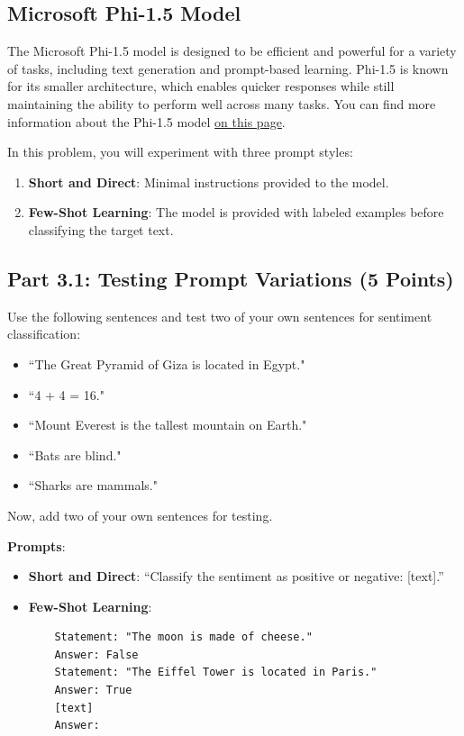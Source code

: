 \documentclass[11pt, oneside]{article}   	%
\begin{document}
\subsection*{Microsoft Phi-1.5 Model}
The Microsoft Phi-1.5 model is designed to be efficient and powerful for a variety of tasks, including text generation and prompt-based learning. Phi-1.5 is known for its smaller architecture, which enables quicker responses while still maintaining the ability to perform well across many tasks. You can find more information about the Phi-1.5 model \href{https://huggingface.co/microsoft/phi-1_5}{on this page}. 

In this problem, you will experiment with three prompt styles:
\begin{enumerate}
    \item \textbf{Short and Direct}: Minimal instructions provided to the model.
    \item \textbf{Few-Shot Learning}: The model is provided with labeled examples before classifying the target text.
\end{enumerate}

\subsection*{Part 3.1: Testing Prompt Variations (5 Points)}

Use the following sentences and test two of your own sentences for sentiment classification:

\begin{itemize}
    \item ``The Great Pyramid of Giza is located in Egypt."
    \item ``4 + 4 = 16."
    \item ``Mount Everest is the tallest mountain on Earth."
    \item ``Bats are blind."
    \item ``Sharks are mammals."
\end{itemize}

Now, add two of your own sentences for testing.

\textbf{Prompts}:
\begin{itemize}
    \item \textbf{Short and Direct}: “Classify the sentiment as positive or negative: [text].”
    \item \textbf{Few-Shot Learning}: 
    \begin{verbatim}
    Statement: "The moon is made of cheese."
    Answer: False
    Statement: "The Eiffel Tower is located in Paris."
    Answer: True
    [text] 
    Answer:
    \end{verbatim}
\end{itemize}
\end{document}
